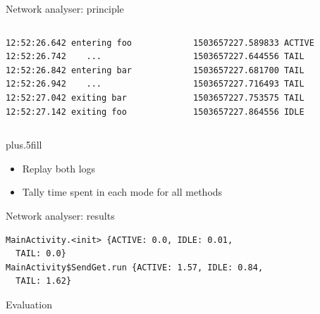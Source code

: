 \begin{frame}[fragile]{Network analyser: principle}
\begin{columns}
\begin{column}{0.5\textwidth}
\begin{lstlisting}
12:52:26.642 entering foo
12:52:26.742 	...
12:52:26.842 entering bar
12:52:26.942 	...
12:52:27.042 exiting bar
12:52:27.142 exiting foo
\end{lstlisting}
\end{column}
\begin{column}{0.5\textwidth}
\begin{lstlisting}
1503657227.589833 ACTIVE
1503657227.644556 TAIL
1503657227.681700 TAIL
1503657227.716493 TAIL
1503657227.753575 TAIL
1503657227.864556 IDLE
\end{lstlisting}
\end{column}
\end{columns}
\vskip0pt plus.5fill
\begin{itemize}
\item Replay both logs
\item Tally time spent in each mode for all methods
\end{itemize}
\end{frame}
%
%
\begin{frame}[fragile]{Network analyser: results}
\begin{lstlisting}
MainActivity.<init> {ACTIVE: 0.0, IDLE: 0.01,
  TAIL: 0.0}
MainActivity$SendGet.run {ACTIVE: 1.57, IDLE: 0.84,
  TAIL: 1.62}
\end{lstlisting}
\end{frame}
%
\begin{frame}[fragile]{Evaluation}
\end{frame}
%
%
%

